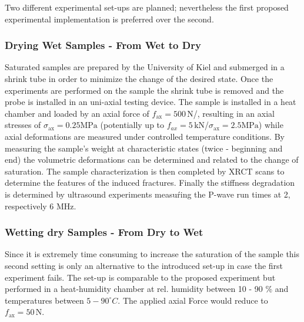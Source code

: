 Two different experimental set-ups are planned; nevertheless the first proposed experimental implementation is preferred over the second.

\subsubsection*{Drying Wet Samples - From Wet to Dry}

Saturated samples are prepared by the University of Kiel and submerged in a shrink tube in order to minimize the change of the desired state. Once the experiments are performed on the sample the shrink tube is removed and the probe is installed in an uni-axial testing device. The sample is installed in a heat chamber and loaded by an axial force of $f_\text{ax} = 500 \, \text{N}$/, resulting in an axial stresses of $\sigma_\text{ax} = 0.25 \text{MPa}$ (potentially up to $f_{ax} = 5 \, \text{kN}$/$ \sigma_\text{ax} = 2.5 \text{MPa}$) while axial deformations are measured under controlled temperature conditions. By measuring the sample's weight at characteristic states (twice - beginning and end) the volumetric deformations can be determined and related to the change of saturation. The sample characterization is then completed by XRCT scans to determine the features of the induced fractures. Finally the stiffness degradation is determined by ultrasound experiments measuŕing the P-wave run times at 2, respectively 6 MHz.

\subsubsection*{Wetting dry Samples - From Dry to Wet}

Since it is extremely time consuming to increase the saturation of the sample this second setting is only an alternative to the introduced set-up in case the first experiment fails. The set-up is comparable to the proposed experiment but performed in a heat-humidity chamber at rel. humidity between 10 - 90 \% and temperatures between $5-90^\circ C$. The applied axial Force would reduce to $f_\text{ax}=50 \, \text{N}$.